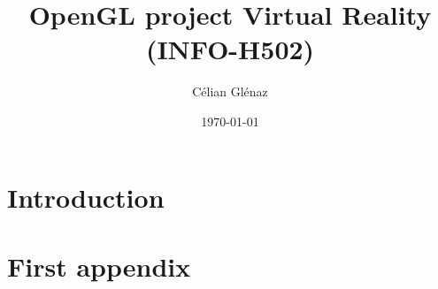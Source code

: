 \documentclass[11pt]{article}
\title{ OpenGL project
        \large Virtual Reality (INFO-H502)}
\author{Célian Glénaz}
\date{\today}
\begin{document}
\maketitle	




\section{Introduction}


\appendix
\section{First appendix}\label{appendix:appendA}

\begin{lstlisting}


\end{lstlisting}
\end{document}
